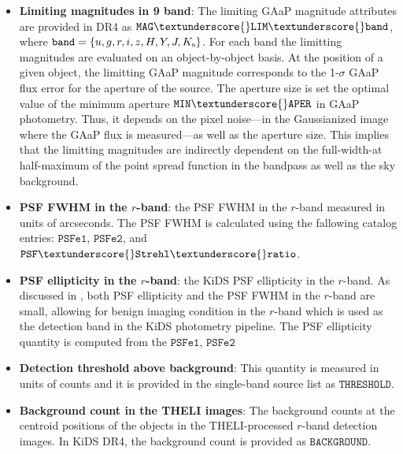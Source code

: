 \documentclass[fleqn,usenatbib,useAMS]{mnras}
\begin{document}
\begin{itemize}

  \item \textbf{Limiting magnitudes in 9 band}: The limiting GAaP magnitude attributes are provided in DR4 as $\mathtt{MAG}\textunderscore{}\mathtt{LIM}\textunderscore{} \mathtt{band}$, where $\mathtt{band} = \{u,g,r,i,z,H,Y,J,K_{\rm s}\}$. 
  For each band the limitting magnitudes are evaluated on an object-by-object basis. At the position of a given object, the limitting GAaP magnitude corresponds to the 1-$\sigma$ GAaP flux error for the aperture of the source. The aperture size is set the optimal value of the minimum aperture $\mathtt{MIN}\textunderscore{}\mathtt{APER}$ in GAaP photometry. Thus, it depends on the pixel noise---in the Gaussianized image where the GAaP flux is measured---as well as the aperture size. This implies that the limitting magnitudes are indirectly dependent on the full-width-at half-maximum of the point spread function in the bandpass as well as the sky background.   
  
  \item \textbf{PSF FWHM in the $r$-band}: the PSF FWHM in the $r$-band measured in units of arcseconds. The PSF FWHM is calculated using the fallowing catalog entries: $\mathtt{PSFe1}$, $\mathtt{PSFe2}$, and $\mathtt{PSF \textunderscore{} Strehl \textunderscore{} ratio}$.
    
    \item \textbf{PSF ellipticity in the $r$-band}: the KiDS PSF ellipticity in the $r$-band. As discussed in \citet{kuijken2019}, both PSF ellipticity and the PSF FWHM in the $r$-band are small, allowing for benign imaging condition in the $r$-band which is used as the detection band in the KiDS photometry pipeline. 
    The PSF ellipticity quantity is computed from the $\mathtt{PSFe1}$, $\mathtt{PSFe2}$
  
  \item \textbf{Detection threshold above background}: This quantity is measured in units of counts and it is provided in the single-band source list as $\mathtt{THRESHOLD}$. 
  
  \item \textbf{Background count in the THELI images}: The background counts at the centroid positions of the objects in the THELI-processed $r$-band detection images. In KiDS DR4, the background count is provided as $\mathtt{BACKGROUND}$.  
  

\end{itemize}
\end{document}
